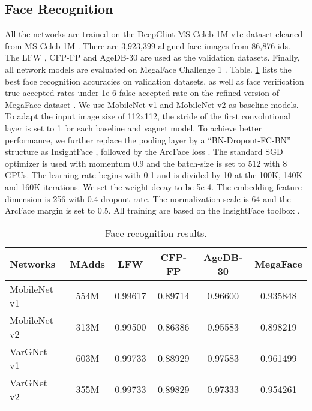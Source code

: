 \documentclass{article}
\begin{document}
\subsection{Face Recognition}
All the networks are trained on the DeepGlint MS-Celeb-1M-v1c dataset \cite{dg} cleaned from MS-Celeb-1M \cite{guo2016ms}. There are 3,923,399 aligned face images from 86,876 ids. The LFW \cite{huang2008labeled} , CFP-FP \cite{sengupta2016frontal} and AgeDB-30 \cite{moschoglou2017agedb} are used as the validation datasets. Finally, all network models are evaluated on MegaFace Challenge 1 \cite{nech2017level}. Table. \ref{tab:face} lists the best face recognition accuracies on validation datasets, as well as face verification true accepted rates under 1e-6 false accepted rate on the refined version of MegaFace dataset \cite{deng2018arcface}. 
We use MobileNet v1 and MobileNet v2 as baseline models. To adapt the input image size of 112x112, the stride of the first convolutional layer is set to 1 for each baseline and vagnet model. To achieve better performance, we further replace the pooling layer by a ``BN-Dropout-FC-BN'' structure as InsightFace \cite{deng2018arcface}, followed by the ArcFace loss \cite{deng2018arcface}. 
The standard SGD optimizer is used with momentum 0.9 and the batch-size is set to 512 with 8 GPUs. The learning rate begins with 0.1 and is divided by 10 at the 100K, 140K and 160K iterations. We set the weight decay to be 5e-4. The embedding feature dimension is 256 with 0.4 dropout rate. The normalization scale is 64 and the ArcFace margin is set to 0.5. All training are based on the InsightFace toolbox \cite{deng2018arcface}. 

\begin{table}
  \centering
  \caption{Face recognition results.}\label{tab:face}
\begin{tabular}{lccccc}
      \toprule
      Networks & MAdds & LFW \cite{huang2008labeled} & CFP-FP \cite{sengupta2016frontal} & AgeDB-30 \cite{moschoglou2017agedb} & MegaFace \cite{deng2018arcface} \\ \midrule
MobileNet v1 & 554M & 0.99617 & 0.89714 & 0.96600 & 0.935848 \\ 
MobileNet v2 & 313M & 0.99500 & 0.86386 & 0.95583 & 0.898219 \\ 
VarGNet v1 & 603M & 0.99733 & 0.88929 & 0.97583 & 0.961499 \\ 
VarGNet v2 & 355M & 0.99733 & 0.89829 & 0.97333 & 0.954261 \\ \bottomrule
\end{tabular}
\end{table}




\end{document}
